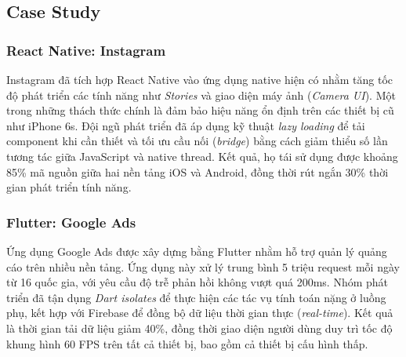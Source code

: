 \subsection{Case Study}
\renewcommand{\labelitemi}{--}    
\subsubsection{React Native: Instagram}
\begin{flushleft}
  \hspace*{0.8cm}Instagram đã tích hợp React Native vào ứng dụng native hiện có nhằm tăng tốc độ phát triển các tính năng như \textit{Stories} và giao diện máy ảnh (\textit{Camera UI}). Một trong những thách thức chính là đảm bảo hiệu năng ổn định trên các thiết bị cũ như iPhone 6s. Đội ngũ phát triển đã áp dụng kỹ thuật \textit{lazy loading} để tải component khi cần thiết và tối ưu cầu nối (\textit{bridge}) bằng cách giảm thiểu số lần tương tác giữa JavaScript và native thread. Kết quả, họ tái sử dụng được khoảng 85\% mã nguồn giữa hai nền tảng iOS và Android, đồng thời rút ngắn 30\% thời gian phát triển tính năng.
\end{flushleft}

\subsubsection{Flutter: Google Ads}
\begin{flushleft}
  \hspace*{0.8cm}Ứng dụng Google Ads được xây dựng bằng Flutter nhằm hỗ trợ quản lý quảng cáo trên nhiều nền tảng. Ứng dụng này xử lý trung bình 5 triệu request mỗi ngày từ 16 quốc gia, với yêu cầu độ trễ phản hồi không vượt quá 200ms. Nhóm phát triển đã tận dụng \textit{Dart isolates} để thực hiện các tác vụ tính toán nặng ở luồng phụ, kết hợp với Firebase để đồng bộ dữ liệu thời gian thực (\textit{real-time}). Kết quả là thời gian tải dữ liệu giảm 40\%, đồng thời giao diện người dùng duy trì tốc độ khung hình 60 FPS trên tất cả thiết bị, bao gồm cả thiết bị cấu hình thấp.
\end{flushleft}

